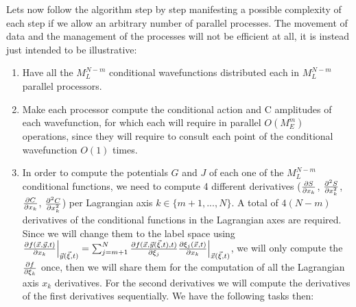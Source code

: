 \documentclass[11pt, a4paper]{article} %
\begin{document}
Lets now follow the algorithm step by step manifesting a possible complexity of each step if we allow an arbitrary number of parallel processes. The movement of data and the management of the processes will not be efficient at all, it is instead just intended to be illustrative:
\begin{enumerate}
\item Have all the $M_L^{N-m}$ conditional wavefunctions distributed each in $M_L^{N-m}$ parallel processors.
\item Make each processor compute the conditional action and C amplitudes of each wavefunction, for which each will require in parallel $O(M_E^m)$ operations, since they will require to consult each point of the conditional wavefunction $O(1)$ times.
\item In order to compute the potentials $G$ and $J$ of each one of the $M_L^{N-m}$ conditional functions, we need to compute 4 different derivatives ($\pdv{S}{x_k}$, $\pdv[2]{S}{x_k}$, $\pdv{C}{x_k}$, $\pdv[2]{C}{x_k}$) per Lagrangian axis $k\in\{m+1,...,N\}$. A total of $4(N-m)$ derivatives of the conditional functions in the Lagrangian axes are required. Since we will change them to the label space using $\pdv{f(\vec{x}, \vec{y},t)}{x_k}\Big\rvert_{\vec{y}(\vec{\xi},t)}=\sum_{j=m+1}^N \pdv{f(\vec{x},\vec{y}(\vec{\xi},t),t)}{\xi_j} \pdv{\xi_j(\vec{x},t)}{x_k}\Big\rvert_{\vec{x}(\vec{\xi},t)}$, we will only compute the $\pdv{f}{\xi_k}$ once, then we will share them for the computation of all the Lagrangian axis $x_k$ derivatives. For the second derivatives we will compute the derivatives of the first derivatives sequentially. We have the following tasks then:
\begin{enumerate}

\end{enumerate}
\end{enumerate}
\end{document}
